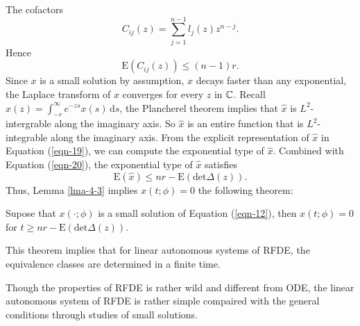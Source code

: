 The cofactors 
\begin{equation}\label{eqn-21}
  C_{ij}(z)=\sum_{j=1}^{n-1} l_{j}(z)z^{n-j}.
\end{equation}
Hence 
\begin{equation}\label{eqn-22}
  \mathrm{E}\left( C_{ij}(z) \right) \le (n-1)r.
\end{equation}
Since $x$ is a small solution by assumption,  $x$ decays faster than any exponential, the Laplace transform of $x$ converges for every $z$ in $\mathbb{C}$. Recall $\widehat{x}(z)=\int_{-r}^{\infty}e^{-zs}x(s)\,\mathrm{d}s$, the Plancherel theorem implies that $\widehat{x}$ is $L^2$-intergrable along the imaginary axis. So $\widehat{x}$ is an entire function that is $L^2$-integrable along the imaginary axis. From the explicit representation of $\widehat{x}$ in Equation (\ref{eqn-19}), we can compute the exponential type of $\widehat{x}$. Combined with Equation (\ref{eqn-20}), the exponential type of $\widehat{x}$ satisfies
\begin{equation}
  \mathrm{E}\left( \widehat{x} \right) \le nr-\mathrm{E}\left(  \mathrm{det}\Delta(z) \right) .
\end{equation}
Thus, Lemma \ref{lma-4-3} implies $x(t;\phi)=0$ the following theorem:
\begin{theorem}
  Supose that $x(\cdot ;\phi)$ is a small solution of Equation {\normalfont (\ref{eqn-12})}, then 
  $x(t;\phi)=0$ for $t\ge nr-\mathrm{E}\left( \mathrm{det}\Delta(z) \right) $.
\end{theorem}
\begin{remark}
This theorem implies that for linear autonomous systems of RFDE, the equivalence classes are determined in a finite time.
\end{remark}
\iffalse
\begin{definition}
  The \textit{ascent} $\alpha$ of a semigroup $T(t)$ is the value defined by
  \begin{equation}
    \alpha=\inf \left\{t: \text{ for all } \epsilon >0, \mathcal{N}(T(t))=\mathcal{N}(T(t+\epsilon ))\right\} .
  \end{equation}
\end{definition}
\begin{definition}
  Define $\epsilon $ and $\sigma$ by
  \begin{equation}
    \mathrm{E}\left( \mathrm{det}\Delta(z) \right) =nr-\epsilon ,\quad \max_{1\le i,j\le n}\mathrm{E}(C_{ij}(z))=(n-1)r-\sigma.
  \end{equation}
\end{definition}
Now we state and prove the following theorem:
\begin{theorem}
  The \textit{ascent} $\alpha$ of the solution operator $T(t)$ associated with Equation {\normalfont(\ref{eqn-12})} is one-to-one if and only if $\mathrm{E}\left( \mathrm{det}\Delta(z) \right) =nr$.
\end{theorem}
\fi

Though the properties of RFDE is rather wild and different from ODE, the linear autonomous system of RFDE is rather simple compaired with the general conditions through studies of small solutions.
